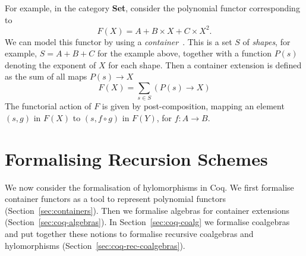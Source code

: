 \documentclass[a4paper,UKenglish,cleveref, autoref, thm-restate]{lipics-v2021}
\newcommand{\Type}{\mathbf{Type}}
\newcommand{\vcomp}{\circ}
\begin{document}
For example, in the category \textbf{Set}, consider the polynomial functor
corresponding to
\[
F(X) = A + B \times X + C \times X^2.
\]
We can model this functor by using a \emph{container}~\cite{AbbottAG05}. This is a set $S$
of \emph{shapes}, for example, $S = A + B + C$ for the example above, together with a function $P(s)$ denoting the exponent of $X$ for each shape.
Then a container extension is defined as the sum of all maps
$P(s) \to X$
\[
F(X) = \sum_{s \in S} (P(s) \to X)
\]
The functorial action
of $F$ is given by post-composition, mapping an element \( (s, g) \) in
\( F(X) \) to \( (s, f \vcomp g ) \) in \( F(Y) \), for $f : A \to B$.




\section{Formalising Recursion Schemes}
\label{sec:recursion-schemes}
We now consider the formalisation of hylomorphisms in Coq. We first formalise
container functors as a tool to represent polynomial functors
(Section~\ref{sec:containers}). Then we formalise algebras for container
extensions (Section~\ref{sec:coq-algebras}). In
Section~\ref{sec:coq-coalg} we formalise coalgebras and put together these notions to
formalise recursive coalgebras and hylomorphisms
(Section~\ref{sec:coq-rec-coalgebras}).
\end{document}
